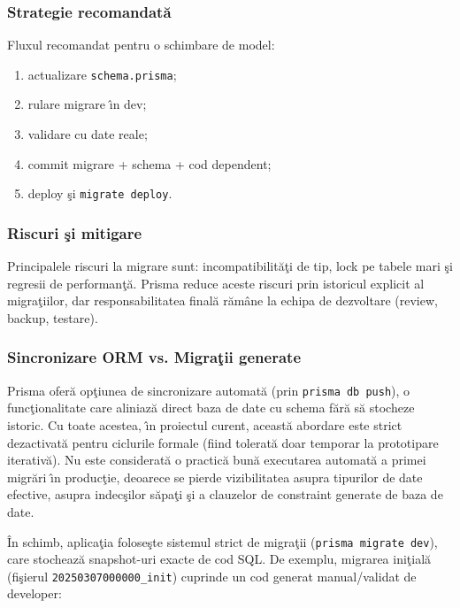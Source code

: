 \documentclass[12pt,onecolumn,draftclsnofoot]{IEEEtran}
\begin{document}
\subsubsection{Strategie recomandat\u{a}}
Fluxul recomandat pentru o schimbare de model:
\begin{enumerate}[label=\arabic*)]
  \item actualizare \texttt{schema.prisma};
  \item rulare migrare \^{\i}n dev;
  \item validare cu date reale;
  \item commit migrare + schema + cod dependent;
  \item deploy \c{s}i \texttt{migrate deploy}.
\end{enumerate}

\subsubsection{Riscuri \c{s}i mitigare}
Principalele riscuri la migrare sunt: incompatibilit\u{a}\c{t}i de tip, lock pe tabele mari \c{s}i regresii de performan\c{t}\u{a}. Prisma reduce aceste riscuri prin istoricul explicit al migra\c{t}iilor, dar responsabilitatea final\u{a} r\u{a}m\^{a}ne la echipa de dezvoltare (review, backup, testare).

\subsubsection{Sincronizare ORM vs. Migra\c{t}ii generate}
Prisma ofer\u{a} op\c{t}iunea de sincronizare automat\u{a} (prin \texttt{prisma db push}), o func\c{t}ionalitate care aliniaz\u{a} direct baza de date cu schema f\u{a}r\u{a} s\u{a} stocheze istoric. Cu toate acestea, \^{\i}n proiectul curent, aceast\u{a} abordare este strict dezactivat\u{a} pentru ciclurile formale (fiind tolerat\u{a} doar temporar la prototipare iterativ\u{a}). Nu este considerat\u{a} o practic\u{a} bun\u{a} executarea automat\u{a} a primei migr\u{a}ri \^{\i}n produc\c{t}ie, deoarece se pierde vizibilitatea asupra tipurilor de date efective, asupra indec\c{s}ilor s\u{a}pa\c{t}i \c{s}i a clauzelor de constraint generate de baza de date.

\^{I}n schimb, aplica\c{t}ia folose\c{s}te sistemul strict de migra\c{t}ii (\texttt{prisma migrate dev}), care stocheaz\u{a} snapshot-uri exacte de cod SQL. De exemplu, migrarea ini\c{t}ial\u{a} (fi\c{s}ierul \texttt{20250307000000\_init}) cuprinde un cod generat manual/validat de developer:
\end{document}
